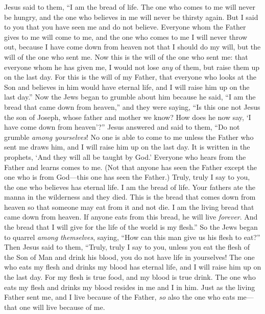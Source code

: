 \begin{biblechapter}
\verse Jesus said to them, “I am the bread of life. The one who comes to me will never be hungry, and the one who believes in me will never be thirsty again.
\verse But I said to you that you have seen me and do not believe.
\verse Everyone whom the Father gives to me will come to me, and the one who comes to me I will never throw out,
\verse because I have come down from heaven not that I should do my will, but the will of the one who sent me.
\verse Now this is the will of the one who sent me: that everyone whom he has given me, I would not lose \textit{any} of them, but raise them up on the last day.
\verse For this is the will of my Father, that everyone who looks at the Son and believes in him would have eternal life, and I will raise him up on the last day.”
\verse Now the Jews began to grumble about him because he said, “I am the bread that came down from heaven,”
\verse and they were saying, “Is this one not Jesus the son of Joseph, whose father and mother we know? How does he now say, ‘I have come down from heaven’?”
\verse Jesus answered and said to them, “Do not grumble \textit{among yourselves}!
\verse No one is able to come to me unless the Father who sent me draws him, and I will raise him up on the last day.
\verse It is written in the prophets, ‘And they will all be taught by God.’ Everyone who hears from the Father and learns comes to me.
\verse (Not that anyone has seen the Father except the one who is from God—this one has seen the Father.)
\verse Truly, truly I say to you, the one who believes has eternal life.
\verse I am the bread of life.
\verse Your fathers ate the manna in the wilderness and they died.
\verse This is the bread that comes down from heaven so that someone may eat from it and not die.
\verse I am the living bread that came down from heaven. If anyone eats from this bread, he will live \textit{forever}. And the bread that I will give for the life of the world is my flesh.”
\verse So the Jews began to quarrel \textit{among themselves}, saying, “How can this man give us his flesh to eat?”
\verse Then Jesus said to them, “Truly, truly I say to you, unless you eat the flesh of the Son of Man and drink his blood, you do not have life in yourselves!
\verse The one who eats my flesh and drinks my blood has eternal life, and I will raise him up on the last day.
\verse For my flesh is true food, and my blood is true drink.
\verse The one who eats my flesh and drinks my blood resides in me and I in him.
\verse Just as the living Father sent me, and I live because of the Father, \textit{so} also the one who eats me—that one will live because of me.

\end{biblechapter}
